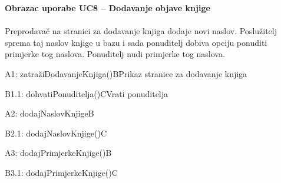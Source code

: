				\textbf{Obrazac uporabe UC8 – Dodavanje objave knjige}\\\\
				Preprodavač na stranici za dodavanje knjiga dodaje novi naslov. Poslužitelj sprema taj naslov knjige u bazu i sada ponuditelj dobiva opciju ponuditi primjerke tog naslova. Ponuditelj nudi primjerke tog naslova.\\
				\begin{center}
					\begin{adjustbox}{max width=\textwidth}
						\begin{sequencediagram}
							\begin{call}{A}{1: zatražiDodavanjeKnjiga()}{B}{Prikaz stranice za dodavanje knjiga}
								\begin{call}{B}{1.1: dohvatiPonuditelja()}{C}{Vrati ponuditelja}
								\end{call}
							\end{call}
							\postlevel
							\begin{messcall}{A}{2: dodajNaslovKnjige}{B}
								\begin{messcall}{B}{2.1: dodajNaslovKnjige()}{C}
								\end{messcall}
							\end{messcall}
							\begin{messcall}{A}{3: dodajPrimjerkeKnjige()}{B}
								\begin{messcall}{B}{3.1: dodajPrimjerkeKnjige()}{C}
								\end{messcall}
							\end{messcall}
						\end{sequencediagram}
					\end{adjustbox}
				\end{center}
				\eject
				

